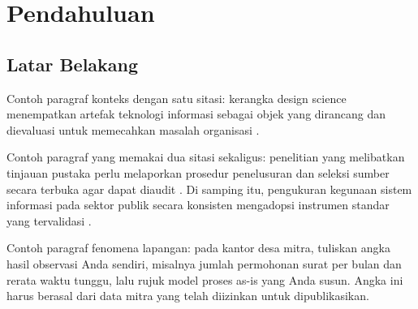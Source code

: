 \chapter{Pendahuluan}
\label{bab:pendahuluan}


\section{Latar Belakang}
\label{sec:latar-belakang}


Contoh paragraf konteks dengan satu sitasi: kerangka design science
menempatkan artefak teknologi informasi sebagai objek yang dirancang dan
dievaluasi untuk memecahkan masalah organisasi \cite{hevner2004design}.

Contoh paragraf yang memakai dua sitasi sekaligus: penelitian yang
melibatkan tinjauan pustaka perlu melaporkan prosedur penelusuran dan
seleksi sumber secara terbuka agar dapat diaudit
\cite{hevner2004design,page2021prisma}. Di samping itu, pengukuran kegunaan sistem informasi pada sektor publik secara konsisten mengadopsi instrumen standar yang tervalidasi \cite{refriansyah2025evaluasi,rizky2024evaluasi}.

Contoh paragraf fenomena lapangan: pada kantor desa mitra, tuliskan angka
hasil observasi Anda sendiri, misalnya jumlah permohonan surat per bulan
dan rerata waktu tunggu, lalu rujuk model proses as-is yang Anda susun.
Angka ini harus berasal dari data mitra yang telah diizinkan untuk
dipublikasikan.

